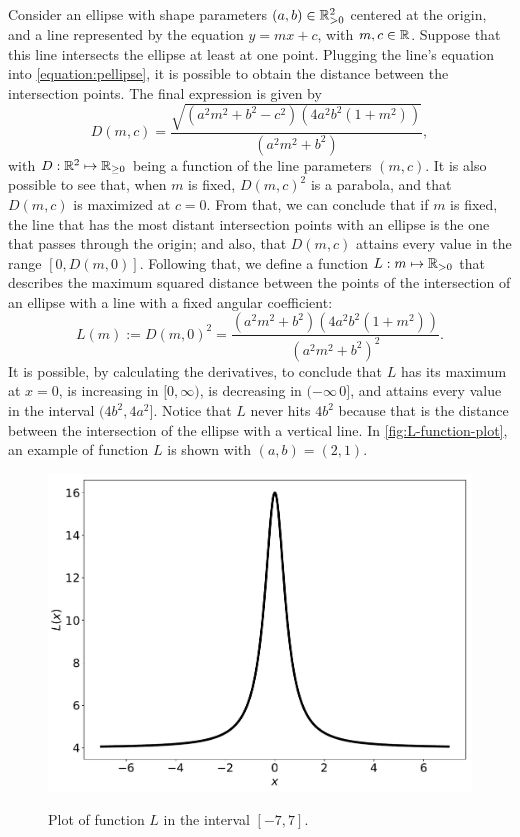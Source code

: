 Consider an ellipse with shape parameters $(a, b)\in\mathbb{R}^2_{>0}$ centered at the origin, and a line represented by the equation $y=mx+c$, with $m, c\in \mathbb{R}$. Suppose that this line intersects the ellipse at least at one point. Plugging the line's equation into \autoref{equation:pellipse}, it is possible to obtain the distance between the intersection points. The final expression is given by
\begin{equation*}\label{eq:dist_line_ellipse}
D(m, c)=\dfrac{\sqrt{(a^2m^2+b^2-c^2)(4a^2b^2(1+m^2))}}{(a^2m^2+b^2)},
\end{equation*}
with $D : \mathbb{R}^2 \mapsto \mathbb{R}_{\ge0}$ being a function of the line parameters $(m, c)$. It is also possible to see that, when $m$ is fixed, $D(m, c)^2$ is a parabola, and that $D(m, c)$ is maximized at $c=0$. From that, we can conclude that if $m$ is fixed, the line that has the most distant intersection points with an ellipse is the one that passes through the origin; and also, that $D(m, c)$ attains every value in the range $[0, D(m, 0)]$. 
Following that, we define a function $L:m\mapsto\mathbb{R}_{>0}$ that describes the maximum squared distance between the points of the intersection of an ellipse with a line with a fixed angular coefficient:
\begin{equation}\label{eq:function-l}
L(m):= D(m, 0)^2 = \dfrac{(a^2m^2+b^2)(4a^2b^2(1+m^2))}{(a^2m^2+b^2)^2}.
\end{equation}
It is possible, by calculating the derivatives, to conclude that $L$ has its maximum at $x=0$, is increasing in $[0, \infty)$, is decreasing in $(-\infty\, 0]$, and attains every value in the interval $(4b^2, 4a^2]$. Notice that $L$ never hits $4b^2$ because that is the distance between the intersection of the ellipse with a vertical line.
In \autoref{fig:L-function-plot}, an example of function $L$ is shown with $(a, b) = (2, 1)$.

\begin{figure}[H]
	\centering
	
	\caption{Plot of function $L$ in the interval $[-7, 7]$.}
	\includegraphics[scale=.4]{tex/figures/L-function-plot}
	\fautor
	\label{fig:L-function-plot}
\end{figure}

